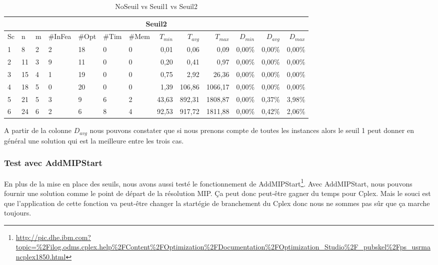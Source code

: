 \begin{table}[h]
\medskip \par
    \begin{tabular}{|l|l|l|l|l|l|l|r|r|r|r|r|r|}
    	\hline
    	\multicolumn{13}{|c|}{Seuil2}\\ \hline
Sc &n	&m	&\#InFea	&\#Opt	&\#Tim &\#Mem	&$T_{min}$ & $T_{avg}$	& $T_{max}$ & $D_{min}$ & $D_{avg}$	& $D_{max}$ \\ \hline
1&	8 &	2&	2	        &18	&0	&0	&0,01	&0,06	&0,09	&0,00\%	&0,00\%	&0,00\%\\ \hline
2&	11&	3&	9	        &11	&0	&0	&0,20	&0,41	&0,97	&0,00\%	&0,00\%	&0,00\% \\ \hline
3&	15&	4&	1	        &19	&0	&0	&0,75	&2,92	&26,36	&0,00\%	&0,00\%	&0,00\% \\ \hline
4 &	18	&5	&0	        &20	&0	&0	&1,39	&106,86	&1066,17&	0,00\%	&0,00\%	&0,00\% \\ \hline
5 &	21	&5	&3	        &9	&6	&2	&43,63	&892,31	&1808,87&	0,00\%	&0,37\%	&3,98\% \\ \hline
6 &	24	&6	&2	        &6	&8	&4	&92,53	&917,72	&1811,88&	0,00\%	&0,42\%	&2,06\% \\ \hline
    \end{tabular}
    \caption{NoSeuil vs Seuil1 vs Seuil2}
    \label{tab_cut2_s2_tab2}
\end{table}
\bigskip
A partir de la colonne $D_{avg}$ nous pouvons constater que si nous prenons compte de toutes les instances alors le seuil 1 peut donner en général une solution qui est la meilleure entre les trois cas.

\clearpage
\subsubsection{Test avec AddMIPStart}
En plus de la mise en place des seuils, nous avons aussi testé le fonctionnement de AddMIPStart\footnote{\url{http://pic.dhe.ibm.com?topic=\%2Filog.odms.cplex.help\%2FContent\%2FOptimization\%2FDocumentation\%2FOptimization_Studio\%2F_pubskel\%2Fps_usrmancplex1850.html}}. Avec AddMIPStart, nous pouvons fournir une solution comme le point de départ de la résolution MIP. Ça peut donc peut-être gagner du temps pour Cplex. Mais le souci est que l'application de cette fonction va peut-être changer la startégie de branchement du Cplex donc nous ne sommes pas sûr que ça marche toujours.


